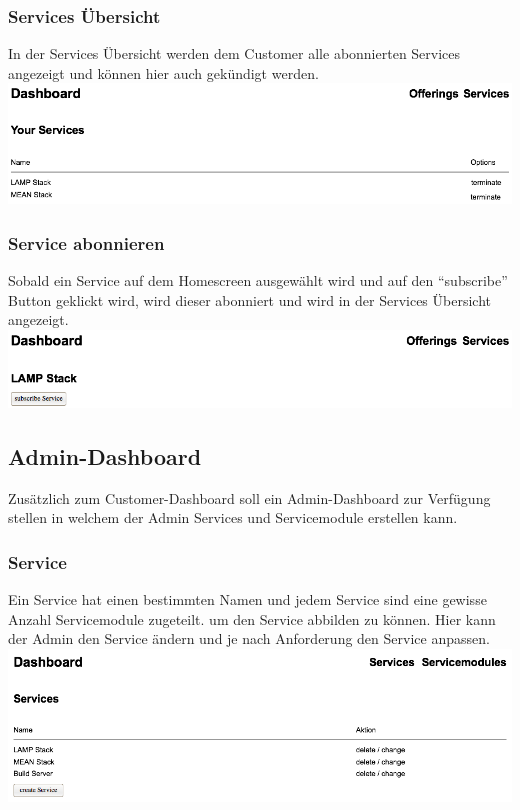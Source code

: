 \documentclass[11pt]{scrartcl}
\begin{document}
\subsubsection{Services Übersicht}
In der Services Übersicht werden dem Customer alle abonnierten Services 
angezeigt und können hier auch gekündigt werden.
\newline
\includegraphics[width=\textwidth]{services_overview}


\subsubsection{Service abonnieren}
Sobald ein Service auf dem Homescreen ausgewählt wird und auf den ``subscribe'' 
Button geklickt wird, wird dieser abonniert und wird in der Services Übersicht 
angezeigt.
\newline
\includegraphics[width=\textwidth]{service_settings}


\newpage
\subsection{Admin-Dashboard}
Zusätzlich zum Customer-Dashboard soll ein Admin-Dashboard zur Verfügung stellen 
in welchem der Admin Services und Servicemodule erstellen kann.

\subsubsection{Service}
Ein Service hat einen bestimmten Namen und jedem Service sind eine gewisse 
Anzahl Servicemodule zugeteilt. um den Service abbilden zu können.
Hier kann der Admin den Service ändern und je nach Anforderung den Service 
anpassen.
\newline
\includegraphics[width=\textwidth]{homescreen_admin}
\end{document}
